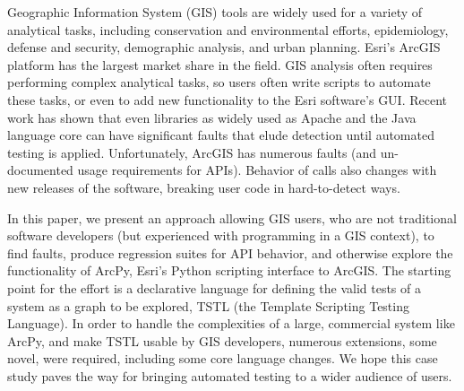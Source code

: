 Geographic Information System (GIS) tools are widely used for a variety of
analytical tasks, including conservation and environmental efforts,
epidemiology, defense and security, demographic analysis, and urban
planning.  Esri's ArcGIS platform has the largest market share in the
field.  GIS analysis often requires performing complex analytical
tasks, so users often write scripts to automate these tasks, or even
to add new functionality to the Esri software's GUI.  Recent work
has shown that even libraries as widely used as Apache and the Java
language core can have significant faults that elude detection until
automated testing is applied.  Unfortunately,  
ArcGIS has numerous faults (and un-documented usage requirements for
APIs).  Behavior of calls also changes with new releases of the
software, breaking user code in hard-to-detect ways.

In this paper, we present an approach allowing GIS users, who are not
traditional software developers (but experienced with programming in a
GIS context), to find faults, produce regression suites for API
behavior, and otherwise explore the functionality of ArcPy, Esri's
Python scripting interface to ArcGIS.  The starting point for the
effort is a declarative language for defining the valid tests of a
system as a graph to be explored, TSTL (the Template Scripting Testing
Language).  In order to handle the complexities of a large, commercial
system like ArcPy, and make TSTL usable by GIS developers, numerous
extensions, some novel, were required, including some core language
changes.  We hope this case study paves the way for bringing automated
testing to a wider audience of users.
